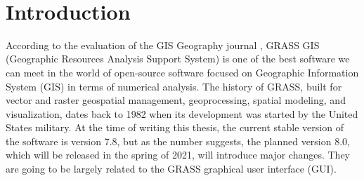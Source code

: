 \documentclass[a4paper,10pt,twoside]{article}
\begin{document}

\newpage ~ \newpage
\thispagestyle{empty}


\newpage

\tableofcontents %
\newpage
\listoffigures %

\thispagestyle{empty}
\newcommand{\obrazek}[1]{(viz obr. \ref{#1})} %

\newpage
\pagestyle{fancy}


\renewcommand{\sectionmark}[1]{\markright{\ #1}}

\fancyhf{} %
\renewcommand{\headrulewidth}{0.4pt} %
\renewcommand{\footrulewidth}{0.4pt}  %
\addtolength{\voffset}{-0.4cm}

\fancyhead[RE, RO]{\nouppercase{\rightmark}}
   
\fancyfoot[RO, LE]{{\textsc{\small \thepage}}}

\fancypagestyle{plain}{
  \fancyhead{} %
  \renewcommand{\headrulewidth}{0pt} %
}


\newpage
\vspace*{-1cm}
\pagestyle{fancy}
\section{Introduction}
\large
\setcounter{page}{17}  %

\noindent According to the evaluation of the GIS Geography journal
\cite{gisgeography}, GRASS GIS (Geographic Resources Analysis Support
System) is one of the best software we can meet in the world of
open-source software focused on Geographic Information System (GIS) 
in terms of numerical analysis. The history of GRASS, built for vector
and raster geospatial management, geoprocessing, spatial modeling, and
visualization, dates back to 1982 when its development was started by
the United States military. At the time of writing this thesis, the current 
stable version of the software is version 7.8, but as the number 
suggests, the planned version 8.0, which will be released in the spring
 of 2021, will introduce major changes. They are going to be largely 
 related to the GRASS graphical user interface (GUI).
\end{document}
